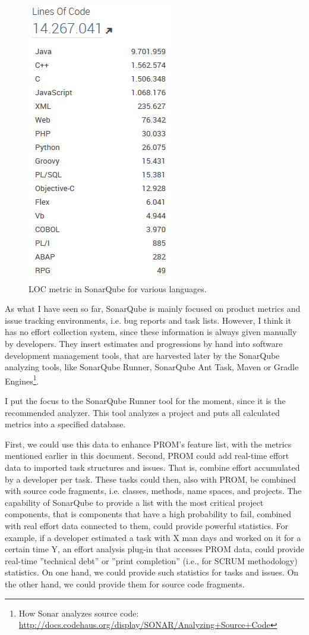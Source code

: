 \begin{figure}[h]
	\centering
	\includegraphics[scale=0.5]{img/lloc.jpg}
	\caption{LOC metric in SonarQube for various languages.} 
	\label{fig:lloc}
\end{figure}

As what I have seen so far, SonarQube is mainly focused on product metrics and
issue tracking environments, i.e. bug reports and task lists. However, I think
it has no effort collection system, since these information is always given
manually by developers. They insert estimates and progressions by hand into
software development management tools, that are harvested later by the SonarQube
analyzing tools, like SonarQube Runner, SonarQube Ant Task, Maven or Gradle
Engines\footnote{How Sonar analyzes source code: \url{http://docs.codehaus.org/display/SONAR/Analyzing+Source+Code}}.

I put the focus to the SonarQube Runner tool for the moment, since it is the
recommended analyzer.  This tool analyzes a project and puts all calculated
metrics into a specified database. 

First, we could use this data to enhance PROM's feature list, with the metrics
mentioned earlier in this document.
Second, PROM could add real-time effort data to imported task structures and
issues. That is, combine effort accumulated by a developer per task. These tasks
could then, also with PROM, be combined with source code fragments, i.e.
classes, methods, name spaces, and projects. The capability of SonarQube to
provide a list with the most critical project components, that is components
that have a high probability to fail, combined with real effort data connected
to them, could provide powerful statistics. For example, if a developer
estimated a task with X man days and worked on it for a certain time Y, an
effort analysis plug-in that accesses PROM data, could provide real-time
''technical debt'' or ''print completion'' (i.e., for SCRUM methodology)
statistics. On one hand, we could provide such statistics for tasks and issues.
On the other hand, we could provide them for source code fragments.

